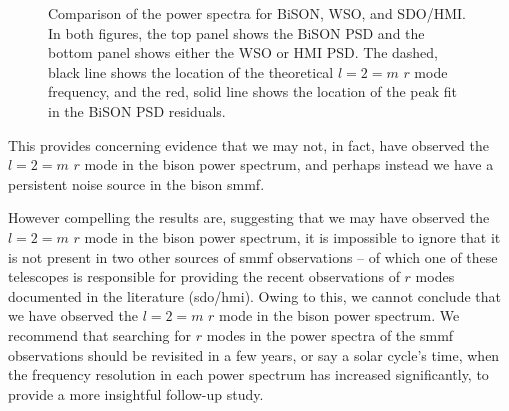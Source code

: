 \begin{figure}[!ht]
	\centering
	\qquad
	\caption{Comparison of the power spectra for BiSON, WSO, and SDO/HMI. In both figures, the top panel shows the BiSON PSD and the bottom panel shows either the WSO or HMI PSD. The dashed, black line shows the location of the theoretical $l=2=m$ $r$ mode frequency, and the red, solid line shows the location of the peak fit in the BiSON PSD residuals.}  \label{fig:comparing_SMMF_PSDs}
\end{figure}

This provides concerning evidence that we may not, in fact, have observed the $l=2=m$ $r$ mode in the \gls{bison} power spectrum, and perhaps instead we have a persistent noise source in the \gls{bison} \gls{smmf}.

However compelling the results are, suggesting that we may have observed the $l=2=m$ $r$ mode in the \gls{bison} power spectrum, it is impossible to ignore that it is not present in two other sources of \gls{smmf} observations -- of which one of these telescopes is responsible for providing the recent observations of $r$ modes documented in the literature (\gls{sdo/hmi}). Owing to this, we cannot conclude that we have observed the $l=2=m$ $r$ mode in the \gls{bison} power spectrum. We recommend that searching for $r$ modes in the power spectra of the \gls{smmf} observations should be revisited in a few years, or say a solar cycle's time, when the frequency resolution in each power spectrum has increased significantly, to provide a more insightful follow-up study.


